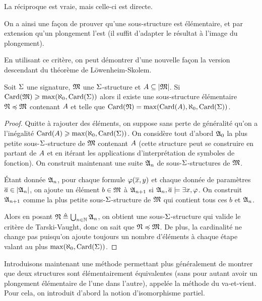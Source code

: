 \begin{remark}
  La réciproque est vraie, mais celle-ci est directe.
\end{remark}

On a ainsi une façon de prouver qu'une sous-structure est élémentaire, et par
extension qu'un plongement l'est (il suffit d'adapter le résultat à l'image
du plongement).

En utilisant ce critère, on peut démontrer d'une nouvelle façon la version
descendant du théorème de Löwenheim-Skolem.

\begin{theorem}
  Soit $\Sigma$ une signature, $\mathfrak{M}$ une $\Sigma$-structure et
  $A\subseteq\left\vert \mathfrak{M}\right\vert$. Si $\operatorname{Card}(\mathfrak{M})\geqslant \max(\aleph_0,\operatorname{Card}(\Sigma))$
  alors il existe une sous-structure élémentaire $\mathfrak{N}\preccurlyeq\mathfrak{M}$
  contenant $A$ et telle que
  $\operatorname{Card}(\mathfrak{N}) = \max(\operatorname{Card}(A),\aleph_0,\operatorname{Card}(\Sigma))$.
\end{theorem}

\begin{proof}
  Quitte à rajouter des éléments, on suppose sans perte de généralité qu'on a
  l'inégalité $\operatorname{Card}(A)\geqslant \max(\aleph_0,\operatorname{Card}(\Sigma))$. On considère tout
  d'abord $\mathfrak{A}_0$ la plus petite sous-$\Sigma$-structure de $\mathfrak{M}$ contenant
  $A$ (cette structure peut se construire en partant de $A$ et en
  itérant les applications d'interprétation de symboles de fonction). On
  construit maintenant une suite $\mathfrak{A}_n$ de sous-$\Sigma$-structures de
  $\mathfrak{M}$.

  \'Etant donnée $\mathfrak{A}_n$, pour chaque formule $\varphi(\overline{x},y)$ et chaque
  donnée de paramètres $\overline{a} \in \left\vert \mathfrak{A}_n\right\vert$, on ajoute un élément
  $b\in\mathfrak{M}$ à $\mathfrak{A}_{n+1}$ si $\mathfrak{A}_n,\overline{a}\models\exists x, \varphi$.
  On construit $\mathfrak{A}_{n+1}$ comme la plus petite sous-$\Sigma$-structure de
  $\mathfrak{M}$ qui contient tous ces $b$ et $\mathfrak{A}_n$.

  Alors en posant $\mathfrak{N}\triangleq \bigcup_{n \in \mathbb N} \mathfrak{A}_n$, on obtient une
  sous-$\Sigma$-structure qui valide le critère de Tarski-Vaught, donc on sait
  que $\mathfrak{N}\preccurlyeq\mathfrak{M}$. De plus, la cardinalité ne change pas puisqu'on
  ajoute toujours un nombre d'éléments à chaque étape valant au plus
  $\max(\aleph_0,\operatorname{Card}(\Sigma))$.
\end{proof}

Introduisons maintenant une méthode permettant plus généralement de montrer que
deux structures sont élémentairement équivalentes (sans pour autant avoir un
plongement élémentaire de l'une dans l'autre), appelée la méthode du
va-et-vient. Pour cela, on introduit d'abord la notion d'isomorphisme partiel.

